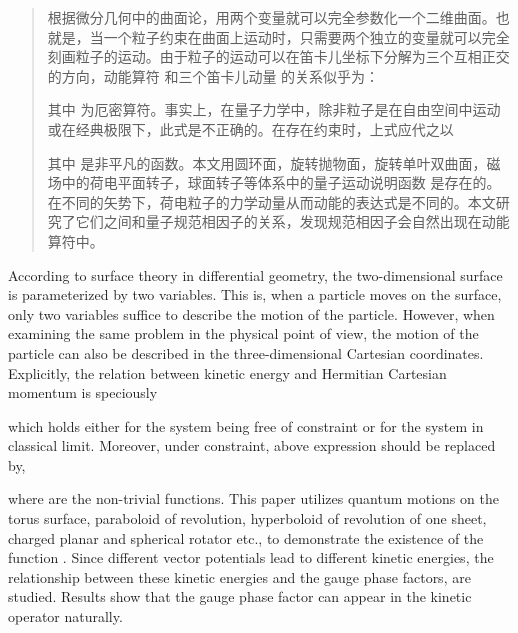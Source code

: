 \documentclass{HNUThesis}
\begin{document}
\makeconsent

\newpage
\tableofcontents

\newpage

\begin{abstract}
    根据微分几何中的曲面论，用两个变量就可以完全参数化一个二维曲面。也就是，当一个粒子约束在曲面上运动时，只需要两个独立的变量就可以完全刻画粒子的运动。由于粒子的运动可以在笛卡儿坐标下分解为三个互相正交的方向，动能算符 和三个笛卡儿动量 的关系似乎为：
                 
其中 为厄密算符。事实上，在量子力学中，除非粒子是在自由空间中运动或在经典极限下，此式是不正确的。在存在约束时，上式应代之以
                
其中 是非平凡的函数。本文用圆环面，旋转抛物面，旋转单叶双曲面，磁场中的荷电平面转子，球面转子等体系中的量子运动说明函数 是存在的。
在不同的矢势下，荷电粒子的力学动量从而动能的表达式是不同的。本文研究了它们之间和量子规范相因子的关系，发现规范相因子会自然出现在动能算符中。

\end{abstract}



\begin{Abstract}
    According to surface theory in differential geometry, the two-dimensional surface is parameterized by two variables. This is, when a particle moves on the surface, only two variables suffice to describe the motion of the particle. However, when examining the same problem in the physical point of view, the motion of the particle can also be described in the three-dimensional Cartesian coordinates. Explicitly, the relation between kinetic energy  and Hermitian Cartesian momentum  is speciously 
 
which holds either for the system being free of constraint or for the system in classical limit. Moreover, under constraint, above expression should be replaced by,
                 
where  are the non-trivial functions. This paper utilizes quantum motions on the torus surface, paraboloid of revolution, hyperboloid of revolution of one sheet, charged planar and spherical rotator etc., to demonstrate the existence of the function .
Since different vector potentials lead to different kinetic energies, the relationship between these kinetic energies and the gauge phase factors, are studied. Results show that the gauge phase factor can appear in the kinetic operator naturally. 
\end{Abstract}
\end{document}
